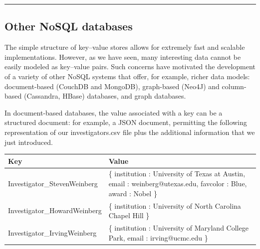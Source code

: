 \documentclass[]{krantz}
\begin{document}
\begin{center}\rule{0.5\linewidth}{\linethickness}\end{center}

\subsection{Other NoSQL databases}\label{other-nosql-databases}

The simple structure of key--value stores allows for extremely fast and
scalable implementations. However, as we have seen, many interesting
data cannot be easily modeled as key--value pairs. Such concerns have
motivated the development of a variety of other NoSQL systems that
offer, for example, richer data models: document-based (CouchDB and
MongoDB), graph-based (Neo4J) and column-based (Cassandra, HBase)
databases, and graph databases.

In document-based databases, the value associated with a key can be a
structured document: for example, a JSON document, permitting the
following representation of our investigators.csv file plus the
additional information that we just introduced.

\begin{longtable}[]{@{}ll@{}}
\toprule
\begin{minipage}[b]{0.14\columnwidth}\raggedright\strut
\textbf{Key}\strut
\end{minipage} & \begin{minipage}[b]{0.14\columnwidth}\raggedright\strut
\textbf{Value}\strut
\end{minipage}\tabularnewline
\midrule
\endhead
\begin{minipage}[t]{0.14\columnwidth}\raggedright\strut
Investigator\_StevenWeinberg\strut
\end{minipage} & \begin{minipage}[t]{0.14\columnwidth}\raggedright\strut
\{ institution : University of Texas at Austin, email :
weinberg@utexas.edu, favcolor : Blue, award : Nobel \}\strut
\end{minipage}\tabularnewline
\begin{minipage}[t]{0.14\columnwidth}\raggedright\strut
Investigator\_HowardWeinberg\strut
\end{minipage} & \begin{minipage}[t]{0.14\columnwidth}\raggedright\strut
\{ institution : University of North Carolina Chapel Hill \}\strut
\end{minipage}\tabularnewline
\begin{minipage}[t]{0.14\columnwidth}\raggedright\strut
Investigator\_IrvingWeinberg\strut
\end{minipage} & \begin{minipage}[t]{0.14\columnwidth}\raggedright\strut
\{ institution : University of Maryland College Park, email :
irving@ucmc.edu \}\strut
\end{minipage}\tabularnewline
\bottomrule
\end{longtable}
\end{document}
